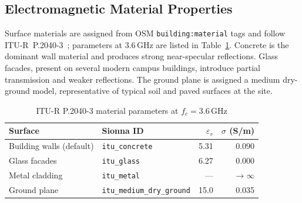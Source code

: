 \subsection{Electromagnetic Material Properties}

Surface materials are assigned from OSM \texttt{building:material} tags
and follow ITU-R~P.2040-3~\cite{itu_p2040}; parameters at $3.6\,\text{GHz}$
are listed in Table~\ref{tab:materials}.
Concrete is the dominant wall material and produces strong near-specular
reflections.
Glass facades, present on several modern campus buildings, introduce partial
transmission and weaker reflections.
The ground plane is assigned a medium dry-ground model, representative of
typical soil and paved surfaces at the site.

\begin{table}[htbp]
  \caption{ITU-R P.2040-3 material parameters at $f_c = 3.6\,\text{GHz}$}
  \label{tab:materials}
  \centering
  \begin{tabular}{llrr}
    \toprule
    Surface & Sionna ID & $\varepsilon_r$ & $\sigma$ (S/m) \\
    \midrule
    Building walls (default) & \texttt{itu\_concrete}          & 5.31 & 0.090 \\
    Glass facades            & \texttt{itu\_glass}             & 6.27 & 0.000 \\
    Metal cladding           & \texttt{itu\_metal}             & ---  & $\to\infty$ \\
    Ground plane             & \texttt{itu\_medium\_dry\_ground} & 15.0 & 0.035 \\
    \bottomrule
  \end{tabular}
\end{table}
